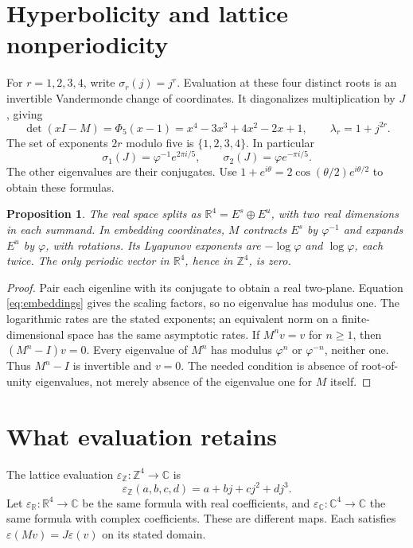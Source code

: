 \documentclass[11pt,a4paper]{article}
\newtheorem{proposition}{Proposition}
\newcommand{\Z}{\mathbb Z}
\newcommand{\R}{\mathbb R}
\newcommand{\C}{\mathbb C}
\newcommand{\ph}{\varphi}
\begin{document}
\section{Hyperbolicity and lattice nonperiodicity}\label{sec:spectrum}
For $r=1,2,3,4$, write $\sigma_r(j)=j^r$.
Evaluation at these four distinct roots is an invertible Vandermonde
change of coordinates. It diagonalizes multiplication by $J$, giving
\begin{equation}\label{eq:spectrum}
 \det(xI-M)=\Phi_5(x-1)=x^4-3x^3+4x^2-2x+1,
 \qquad \lambda_r=1+j^{2r}.
\end{equation}
The set of exponents $2r$ modulo five is $\{1,2,3,4\}$. In particular
\begin{equation}\label{eq:embeddings}
 \sigma_1(J)=\ph^{-1}e^{2\pi i/5},\qquad
 \sigma_2(J)=\ph e^{-\pi i/5}.
\end{equation}
The other eigenvalues are their conjugates. Use
$1+e^{i\theta}=2\cos(\theta/2)e^{i\theta/2}$ to obtain these formulas.

\begin{proposition}\label{prop:hyperbolic}
The real space splits as $\R^4=E^s\oplus E^u$, with two real
dimensions in each summand. In embedding coordinates, $M$ contracts
$E^s$ by $\ph^{-1}$ and expands $E^u$ by $\ph$, with rotations.
Its Lyapunov exponents are $-\log\ph$ and $\log\ph$, each twice.
The only periodic vector in $\R^4$, hence in $\Z^4$, is zero.
\end{proposition}
\begin{proof}
Pair each eigenline with its conjugate to obtain a real two-plane.
Equation \eqref{eq:embeddings} gives the scaling factors, so no
eigenvalue has modulus one. The logarithmic rates are the stated
exponents; an equivalent norm on a finite-dimensional space has the
same asymptotic rates. If $M^n v=v$ for $n\geq1$, then
$(M^n-I)v=0$. Every eigenvalue of $M^n$ has modulus $\ph^n$ or
$\ph^{-n}$, neither one. Thus $M^n-I$ is invertible and $v=0$.
The needed condition is absence of root-of-unity eigenvalues, not
merely absence of the eigenvalue one for $M$ itself.
\end{proof}

\section{What evaluation retains}\label{sec:evaluation}
The lattice evaluation $\varepsilon_{\Z}:\Z^4\to\C$ is
\begin{equation}\label{eq:evaluation}
 \varepsilon_{\Z}(a,b,c,d)=a+bj+cj^2+dj^3.
\end{equation}
Let $\varepsilon_{\R}:\R^4\to\C$ be the same formula with real
coefficients, and $\varepsilon_{\C}:\C^4\to\C$ the same formula
with complex coefficients. These are different maps. Each satisfies
$\varepsilon(Mv)=J\varepsilon(v)$ on its stated domain.
\end{document}
